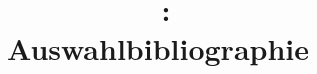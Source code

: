 \documentclass[ngerman]{article}
\begin{document}
\title{\lectype\ \lecfulltitle:\\Auswahlbibliographie}

\date{\lecsemesterverb}

\maketitle

\makesessionbib
\end{document}
